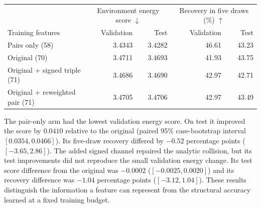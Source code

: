 \begin{center}\small
\begin{tabular}{lrrrr}
\hline
 & \multicolumn{2}{c}{Environment energy score $\downarrow$}
 & \multicolumn{2}{c}{Recovery in five draws (\%) $\uparrow$}\\
Training features & Validation & Test & Validation & Test\\\hline
Pairs only (58) & 3.4343 & 3.4282 & 46.61 & 43.23\\
Original (70) & 3.4711 & 3.4693 & 41.93 & 43.75\\
Original + signed triple (71) & 3.4686 & 3.4690 & 42.97 & 42.71\\
Original + reweighted pair (71) & 3.4705 & 3.4706 & 42.97 & 43.49\\\hline
\end{tabular}
\end{center}
The pair-only arm had the lowest validation energy score. On test it improved the score by $0.0410$ relative to the original (paired 95\% case-bootstrap interval $[0.0354,0.0466]$). Its five-draw recovery differed by $-0.52$ percentage points ($[-3.65,2.86]$). The added signed channel repaired the analytic collision, but its test improvements did not reproduce the small validation energy change. Its test score difference from the original was $-0.0002$ ($[-0.0025,0.0020]$) and its recovery difference was $-1.04$ percentage points ($[-3.12,1.04]$). These results distinguish the information a feature can represent from the structural accuracy learned at a fixed training budget.
